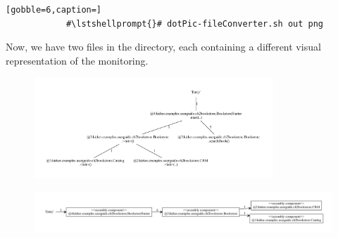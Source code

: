 		\setBashListing
		\begin{lstlisting}[gobble=6,caption=]			
			#\lstshellprompt{}# dotPic-fileConverter.sh out png
		\end{lstlisting} 
		
		\noindent
		Now, we have two  files in the  directory, each containing a different visual representation of the monitoring.		
		
		\begin{figure}[H]
			\centering
			\includegraphics[width=0.8\textwidth]{images/aggregatedAssemblyCallTree.pdf}
		\end{figure}
		\begin{figure}[H]
			\centering
			\includegraphics[width=1.0\textwidth]{images/assemblyComponentDependencyGraph.pdf}
		\end{figure}
